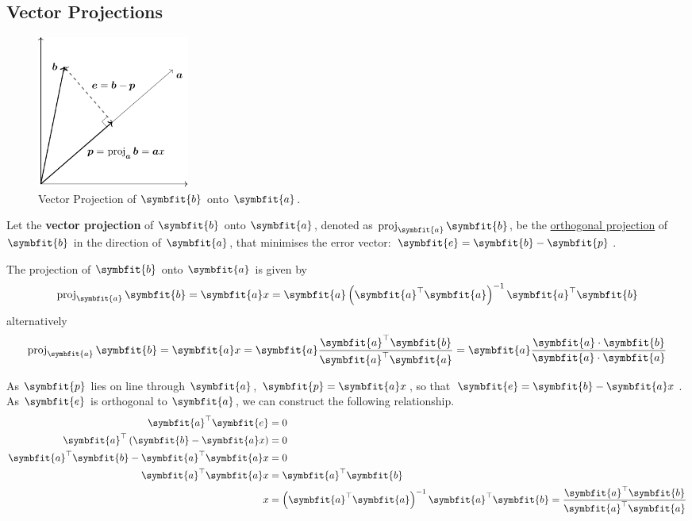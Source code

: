 \documentclass{article}
\begin{document}
	\subsection{Vector Projections}
	\begin{figure}[H]
		\centering
		\includegraphics[height=5cm, keepaspectratio]{figures/vector_projection.pdf}
		\caption{Vector Projection of $\symbfit{b}$ onto $\symbfit{a}$.}
	\end{figure}
	\begin{definition}
		Let the \textbf{vector projection} of $\symbfit{b}$ onto $\symbfit{a}$, denoted as $\proj_{\symbfit{a}}\symbfit{b}$, be the \linebreak \underline{orthogonal projection} of $\symbfit{b}$ in the direction of $\symbfit{a}$, that minimises the error vector: $\symbfit{e}=\symbfit{b}-\symbfit{p}$.
	\end{definition}
	\begin{theorem}
	The projection of $\symbfit{b}$ onto $\symbfit{a}$ is given by
	\begin{equation*}
		\proj_{\symbfit{a}}\symbfit{b} = \symbfit{a} x = \symbfit{a} \left( \symbfit{a}^\top \symbfit{a} \right)^{-1}\symbfit{a}^\top \symbfit{b}
	\end{equation*}
	alternatively
	\begin{equation*}
		\proj_{\symbfit{a}}\symbfit{b} = \symbfit{a} x = \symbfit{a} \frac{\symbfit{a}^\top \symbfit{b}}{\symbfit{a}^\top \symbfit{a}} = \symbfit{a} \frac{\symbfit{a}\cdot\symbfit{b}}{\symbfit{a}\cdot\symbfit{a}}
	\end{equation*}
	\end{theorem}
	\begin{solution}[Proof]
		As $\symbfit{p}$ lies on line through $\symbfit{a}$, $\symbfit{p}=\symbfit{a}x$, so that $\symbfit{e}=\symbfit{b}-\symbfit{a}x$. As $\symbfit{e}$ is orthogonal to $\symbfit{a}$, we can construct the following relationship.
		\begin{align*}
			\symbfit{a}^\top \symbfit{e} &= 0 \\
			\symbfit{a}^\top \left( \symbfit{b} - \symbfit{a}x \right) &= 0 \\
			\symbfit{a}^\top \symbfit{b} - \symbfit{a}^\top \symbfit{a}x &= 0 \\
			\symbfit{a}^\top \symbfit{a}x &= \symbfit{a}^\top \symbfit{b} \\
			x &= \left( \symbfit{a}^\top \symbfit{a} \right)^{-1}\symbfit{a}^\top \symbfit{b} = \frac{\symbfit{a}^\top \symbfit{b}}{\symbfit{a}^\top \symbfit{a}}
		\end{align*}
	\end{solution}
\end{document}
